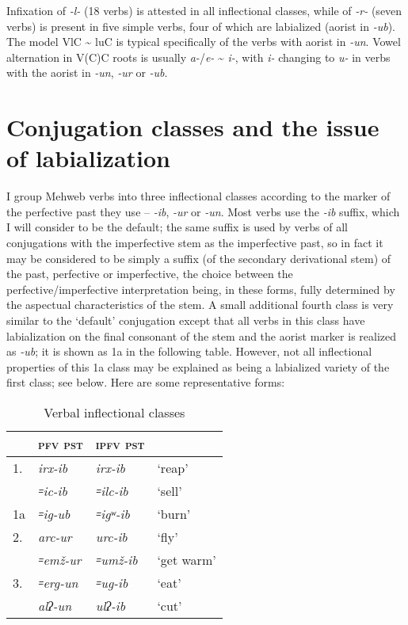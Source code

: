 \documentclass[output=paper]{langsci/langscibook}
\begin{document}
Infixation of \emph{-l-} (18 verbs) is attested in all inflectional
classes, while  of \emph{-r-} (seven verbs) is present in five
simple verbs, four of which are labialized (aorist in \emph{-ub}). The
model VlC \textasciitilde{} luC is typical specifically of the verbs
with aorist in \emph{-un}. Vowel alternation in V(C)C roots is usually
\emph{a-}/\emph{e-} \textasciitilde{} \emph{i-}, with \emph{i-} changing
to \emph{u-} in verbs with the aorist in \emph{-un}, \emph{-ur} or
\emph{-ub}.



\section{Conjugation classes and the issue of labialization}\label{conjugation-classes-and-the-issue-of-labialization}


I group Mehweb verbs into three inflectional classes according to the
marker of the perfective past they use – \emph{-ib}, \emph{-ur} or
\emph{-un}. Most verbs use the \emph{-ib} suffix, which I will consider
to be the default; the same suffix is used by verbs of all conjugations
with the imperfective stem as the imperfective past, so in fact it may
be considered to be simply a suffix (of the secondary derivational stem)
of the past, perfective or imperfective, the choice between the
perfective/imperfective interpretation being, in these forms, fully
determined by the aspectual characteristics of the stem. A small
additional fourth class is very similar to the `default' conjugation
except that all verbs in this class have labialization on the final
consonant of the stem and the aorist marker is realized as \emph{-ub};
it is shown as 1a in the following table. However, not all inflectional
properties of this 1a class may be explained as being a labialized
variety of the first class; see below. Here are some representative
forms:

\begin{table}
\caption{Verbal inflectional classes}

\begin{tabular}{@{}llll@{}}
\toprule
& \textsc{pfv} \textsc{pst} & \textsc{ipfv} \textsc{pst} &\tabularnewline \midrule
1. & \emph{irx-ib} & \emph{irx-ib} & `reap'\tabularnewline
& \emph{꞊ic-ib} & \emph{꞊ilc-ib} & `sell'\tabularnewline
1a & \emph{꞊ig-ub} & \emph{꞊igʷ-ib} & `burn'\tabularnewline\midrule
2. & \emph{arc-ur} & \emph{urc-ib} & `fly'\tabularnewline
& \emph{꞊emž-ur} & \emph{꞊umž-ib} & `get warm'\tabularnewline \midrule
3. & \emph{꞊erg-un } & \emph{꞊ug-ib} & `eat'\tabularnewline 
& \emph{alʔ-un} & \emph{ulʔ-ib} & `cut'\tabularnewline
\bottomrule
\end{tabular}
\end{table}
\end{document}

